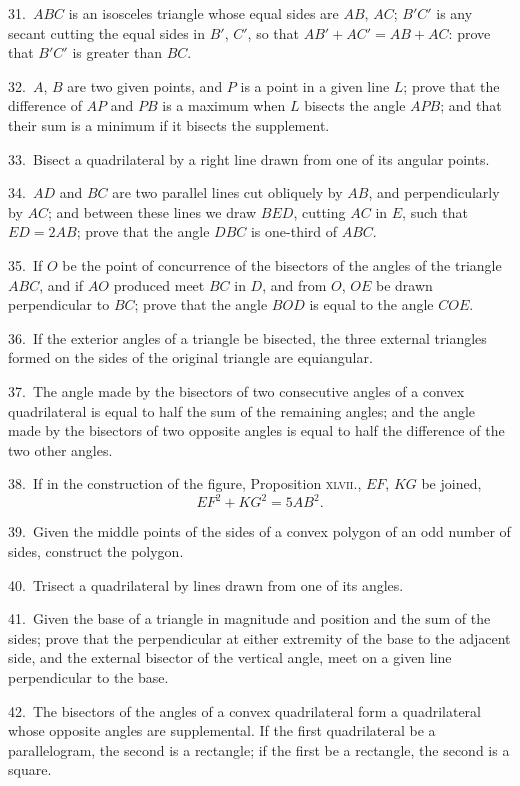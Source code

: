 \documentclass[oneside]{book}
\begin{document}
\begin{footnotesize}
31.~$ABC$ is an isosceles triangle whose equal sides are $AB$, $AC$;
$B'C'$ is any secant cutting the equal sides in $B'$, $C'$, so that
$AB' + AC' = AB + AC$: prove that $B'C'$ is greater than $BC$.

32.~$A$, $B$ are two given points, and $P$ is a point in a given line
$L$; prove that the difference of $AP$ and $PB$ is a maximum when
$L$ bisects the angle $APB$; and that their sum is a minimum if it
bisects the supplement.

33.~Bisect a quadrilateral by a right line drawn from one of
its angular points.

34.~$AD$ and $BC$ are two parallel lines cut obliquely by $AB$, and
perpendicularly by $AC$; and between these lines we draw $BED$,
cutting $AC$ in $E$, such that $ED = 2AB$; prove that the angle $DBC$
is one-third of $ABC$.

35.~If $O$ be the point of concurrence of the bisectors of the
angles of the triangle $ABC$, and if $AO$ produced meet $BC$ in $D$,
and from $O$, $OE$ be drawn perpendicular to $BC$; prove that the
angle $BOD$ is equal to the angle $COE$.

36.~If the exterior angles of a triangle be bisected, the three
external triangles formed on the sides of the original triangle are
equiangular.

37.~The angle made by the bisectors of two consecutive angles
of a convex quadrilateral is equal to half the sum of the
remaining angles; and the angle made by the bisectors of two opposite
angles is equal to half the difference of the two other angles.

38.~If in the construction of the figure, Proposition \textsc{xlvii.},
$EF$, $KG$ be joined,
\[
EF^2 + KG^2 = 5AB^2.
\]

39.~Given the middle points of the sides of a convex polygon
of an odd number of sides, construct the polygon.

40.~Trisect a quadrilateral by lines drawn from one of its
angles.

41.~Given the base of a triangle in magnitude and position and
the sum of the sides; prove that the perpendicular at either extremity
of the base to the adjacent side, and the external bisector
of the vertical angle, meet on a given line perpendicular to the
base.

42.~The bisectors of the angles of a convex quadrilateral form
a quadrilateral whose opposite angles are supplemental. If the
first quadrilateral be a parallelogram, the second is a rectangle;
if the first be a rectangle, the second is a square.


\end{footnotesize}
\end{document}
